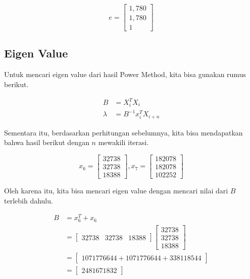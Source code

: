 \documentclass{article}
\begin{document}
$$
e = 
    \begin{bmatrix}
        1,780\\
        1,780\\
        1
    \end{bmatrix}
$$

\subsection{Eigen Value}
Untuk mencari eigen value dari hasil Power Method, kita bisa gunakan rumus berikut.

\begin{align*}
    B &= X_i^TX_i\\
    \lambda &= B^{-1}x_i^TX_{i+n}
\end{align*}

Sementara itu, berdasarkan perhitungan sebelumnya, kita bisa mendapatkan bahwa hasil berikut dengan $n$ mewakili iterasi.

$$
x_6 = \begin{bmatrix}
        32738\\
        32738\\
        18388
    \end{bmatrix}
    ,
x_7 = \begin{bmatrix}
        182078\\
        182078\\
        102252
    \end{bmatrix}
$$

Oleh karena itu, kita bisa mencari eigen value dengan mencari nilai dari $B$ terlebih dahulu.

\begin{align*}
    B &= x_6^T + x_6\\
    &=
    \begin{bmatrix}
        32738 & 32738 & 18388
    \end{bmatrix}
    \begin{bmatrix}
        32738\\
        32738\\
        18388
    \end{bmatrix}\\
    &= \begin{bmatrix}
        1071776644 + 1071776644 + 338118544
    \end{bmatrix}\\
    &= \begin{bmatrix}
        2481671832
    \end{bmatrix}
\end{align*}
\end{document}
